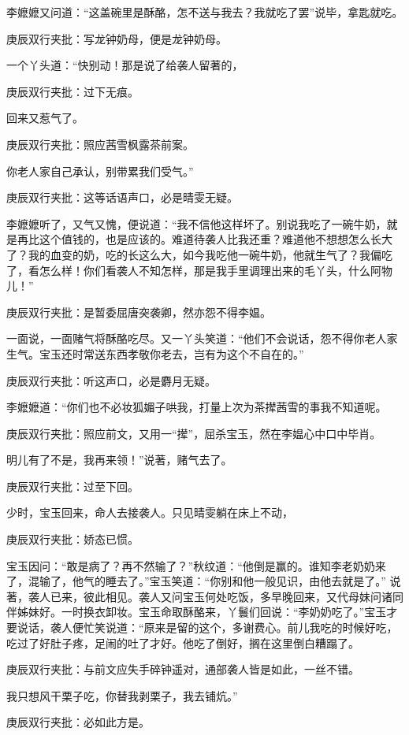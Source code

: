 \begin{parag}


    李嬷嬷又问道：“这盖碗里是酥酪，怎不送与我去？我就吃了罢”说毕，拿匙就吃。\begin{note}庚辰双行夹批：写龙钟奶母，便是龙钟奶母。\end{note}一个丫头道：“快别动！那是说了给袭人留著的，\begin{note}庚辰双行夹批：过下无痕。\end{note}回来又惹气了。\begin{note}庚辰双行夹批：照应茜雪枫露茶前案。\end{note}你老人家自己承认，别带累我们受气。”\begin{note}庚辰双行夹批：这等话语声口，必是晴雯无疑。\end{note}李嬷嬷听了，又气又愧，便说道：“我不信他这样坏了。别说我吃了一碗牛奶，就是再比这个值钱的，也是应该的。难道待袭人比我还重？难道他不想想怎么长大了？我的血变的奶，吃的长这么大，如今我吃他一碗牛奶，他就生气了？我偏吃了，看怎么样！你们看袭人不知怎样，那是我手里调理出来的毛丫头，什么阿物儿！”\begin{note}庚辰双行夹批：是暂委屈唐突袭卿，然亦怨不得李媪。\end{note}一面说，一面赌气将酥酪吃尽。又一丫头笑道：“他们不会说话，怨不得你老人家生气。宝玉还时常送东西孝敬你老去，岂有为这个不自在的。”\begin{note}庚辰双行夹批：听这声口，必是麝月无疑。\end{note}李嬷嬷道：“你们也不必妆狐媚子哄我，打量上次为茶撵茜雪的事我不知道呢。\begin{note}庚辰双行夹批：照应前文，又用一“撵”，屈杀宝玉，然在李媪心中口中毕肖。\end{note}明儿有了不是，我再来领！”说著，赌气去了。\begin{note}庚辰双行夹批：过至下回。\end{note}
\end{parag}


\begin{parag}


    少时，宝玉回来，命人去接袭人。只见晴雯躺在床上不动，\begin{note}庚辰双行夹批：娇态已惯。\end{note}宝玉因问：“敢是病了？再不然输了？”秋纹道：“他倒是赢的。谁知李老奶奶来了，混输了，他气的睡去了。”宝玉笑道：“你别和他一般见识，由他去就是了。” 说著，袭人已来，彼此相见。袭人又问宝玉何处吃饭，多早晚回来，又代母妹问诸同伴姊妹好。一时换衣卸妆。宝玉命取酥酪来，丫鬟们回说：“李奶奶吃了。”宝玉才要说话，袭人便忙笑说道：“原来是留的这个，多谢费心。前儿我吃的时候好吃，吃过了好肚子疼，足闹的吐了才好。他吃了倒好，搁在这里倒白糟蹋了。\begin{note}庚辰双行夹批：与前文应失手碎钟遥对，通部袭人皆是如此，一丝不错。\end{note}我只想风干栗子吃，你替我剥栗子，我去铺炕。”\begin{note}庚辰双行夹批：必如此方是。\end{note}
\end{parag}


